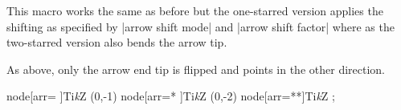 \begin{multicols}{2}
\begin{command}{\arrow{}}
  This macro works the same as before but the one-starred version
  applies the shifting as specified
  by |arrow shift mode| and |arrow shift factor|
  where as the two-starred version also bends the arrow tip.
\end{command}
\begin{command}{\arrowreversed{}}
  As above, only the arrow end tip is flipped and points in the other direction.
\end{command}
\begin{codeexample}[width=2cm,preamble=\usetikzlibrary{bending, decorations.markings, ext.arrows-plus}]
\tikz[y=1.5cm, >=Stealth, arrows={[round]}, nodes={circle, draw}]
  \path   node[arr=  ]{Ti\emph kZ} %
   (0,-1) node[arr=* ]{Ti\emph kZ} %
   (0,-2) node[arr=**]{Ti\emph kZ} %
  ;
\end{codeexample}
\end{multicols}
\endinput